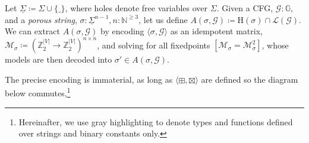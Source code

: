 \documentclass[sigplan,review,anonymous,acmsmall]{acmart}\settopmatter{printfolios=false,printccs=false,printacmref=false}
\begin{document}
\begin{definition}
Let $\underline\Sigma \coloneqq \Sigma \cup \{\_\}$, where holes denote free variables over $\Sigma$. Given a CFG, $\mathcal{G}: \mathbb{G}$, and a \textit{porous string}, $\sigma: \underline\Sigma^{n-1}, n: \mathbb{N}^{\geq 3}$, let us define $A(\sigma, \mathcal{G})\coloneqq\text{H}(\sigma)\cap\mathcal{L}(\mathcal{G})$. We can extract $A(\sigma, \mathcal{G})$ by encoding $\langle\sigma, \mathcal{G}\rangle$ as an idempotent matrix, $\mathcal{M}_\sigma\coloneqq (\mathbb{Z}_2^{|V|}\rightarrow\mathbb{Z}_2^{|V|})^{n \times n}$, and solving for all fixedpoints $[\mathcal{M}_\sigma = \mathcal{M}_\sigma^2]$, whose models are then decoded into $\sigma' \in A(\sigma, \mathcal{G})$.
\end{definition}

\noindent The precise encoding is immaterial, as long as $\langle\boxplus, \boxtimes\rangle$ are defined so the diagram below commutes,\footnote{Hereinafter, we use gray highlighting to denote types and functions defined over strings and binary constants only.}
\end{document}

